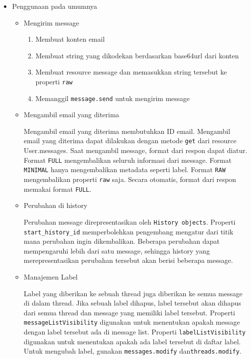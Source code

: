 \documentclass[a4paper,twoside]{article}
\begin{document}
\begin{enumerate}
\begin{itemize}
\begin{itemize}
			\item Penggunaan pada umumnya
			
			\begin{itemize}
				\item Mengirim message

				\begin{enumerate}
					\item Membuat konten email
					\item Membuat string yang dikodekan berdasarkan base64url dari konten
					\item Membuat resource message dan memasukkan string tersebut ke properti \texttt{raw}
					\item Memanggil \texttt{message.send} untuk mengirim message
				\end{enumerate}

				\item Mengambil email yang diterima
			
				Mengambil email yang diterima membutuhkan ID email. Mengambil email yang diterima dapat dilakukan dengan metode \texttt{get} dari resource User.messages. Saat mengambil message, format dari respon dapat diatur. Format \texttt{FULL} mengembalikan seluruh informasi dari message. Format \texttt{MINIMAL} hanya mengembalikan metadata seperti label. Format \texttt{RAW} mengembalikan properti \texttt{raw} saja. Secara otomatis, format dari respon memakai format \texttt{FULL}.
			
				\item Perubahan di history
			
				Perubahan message direpresentasikan oleh \texttt{History objects}. Properti \texttt{start\_history\_id} memperbolehkan pengembang mengatur dari titik mana perubahan ingin dikembalikan. Beberapa perubahan dapat mempengaruhi lebih dari satu message, sehingga history yang merepresentasikan perubahan tersebut akan berisi beberapa message.
			
				\item Manajemen Label
			
				Label yang diberikan ke sebuah thread juga diberikan ke semua message di dalam thread. Jika sebuah label dihapus, label tersebut akan dihapus dari semua thread dan message yang memiliki label tersebut. Properti \texttt{messageListVisibility} digunakan untuk menentukan apakah message dengan label tersebut ada di message list. Properti \texttt{labelListVisibility} digunakan untuk menentukan apakah ada label tersebut di daftar label. Untuk mengubah label, gunakan \texttt{messages.modify} dan\texttt{threads.modify}.
			

\end{itemize}
\end{itemize}
\end{itemize}
\end{enumerate}
\end{document}
